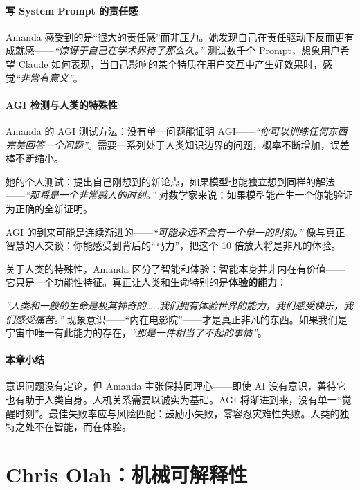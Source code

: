 \subsection{写 System Prompt 的责任感}

Amanda 感受到的是``很大的责任感''而非压力。她发现自己在责任驱动下反而更有成就感——\textit{``惊讶于自己在学术界待了那么久。''} 测试数千个 Prompt，想象用户希望 Claude 如何表现，当自己影响的某个特质在用户交互中产生好效果时，感觉\textit{``非常有意义''}。

\subsection{AGI 检测与人类的特殊性}

Amanda 的 AGI 测试方法：没有单一问题能证明 AGI——\textit{``你可以训练任何东西完美回答一个问题''}。需要一系列处于人类知识边界的问题，概率不断增加，误差棒不断缩小。

她的个人测试：提出自己刚想到的新论点，如果模型也能独立想到同样的解法——\textit{``那将是一个非常感人的时刻。''} 对数学家来说：如果模型能产生一个你能验证为正确的全新证明。

AGI 的到来可能是连续渐进的——\textit{``可能永远不会有一个单一的时刻。''} 像与真正智慧的人交谈：你能感受到背后的``马力''，把这个 10 倍放大将是非凡的体验。

关于人类的特殊性，Amanda 区分了智能和体验：智能本身并非内在有价值——它只是一个功能性特征。真正让人类和生命特别的是\textbf{体验的能力}：

\textit{``人类和一般的生命是极其神奇的……我们拥有体验世界的能力，我们感受快乐，我们感受痛苦。''} 现象意识——``内在电影院''——才是真正非凡的东西。如果我们是宇宙中唯一有此能力的存在，\textit{``那是一件相当了不起的事情''}。

\subsection{本章小结}

意识问题没有定论，但 Amanda 主张保持同理心——即使 AI 没有意识，善待它也有助于人类自身。人机关系需要以诚实为基础。AGI 将渐进到来，没有单一``觉醒时刻''。最佳失败率应与风险匹配：鼓励小失败，零容忍灾难性失败。人类的独特之处不在智能，而在体验。

\part{Chris Olah：机械可解释性}


